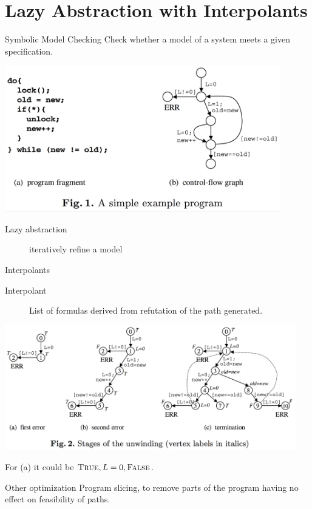\documentclass{beamer}
\begin{document}
\section{Lazy Abstraction with Interpolants}

\begin{frame}{Symbolic Model Checking}
  Check whether a model of a system meets a given specification.

  \includegraphics[width=0.9\textwidth]{interpolants_fig1.png}

  \begin{description}
    \item[Lazy abstraction] iteratively refine a model
  \end{description}
\end{frame}

\begin{frame}{Interpolants}
  \begin{description}
    \item[Interpolant] List of formulas derived from refutation of the path generated.
  \end{description}

  \includegraphics[width=0.95\textwidth]{interpolants_fig2.png}

  For (a) it could be $\textsc{True}, L=0, \textsc{False}$.
\end{frame}

\begin{frame}{Other optimization}
  Program slicing, to remove parts of the program having no effect on feasibility of paths.
\end{frame}



\end{document}
